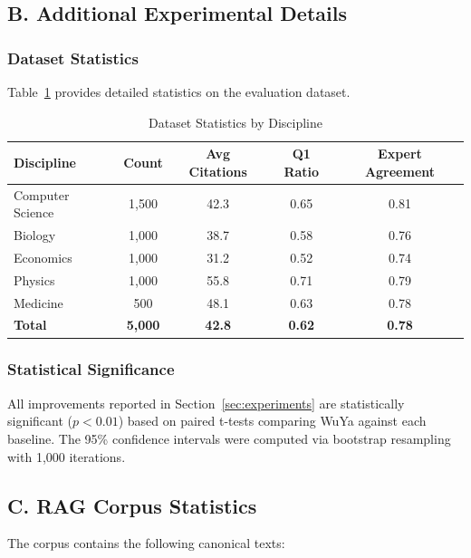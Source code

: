 \subsection{B. Additional Experimental Details}

\subsubsection{Dataset Statistics}

Table~\ref{tab:dataset-stats} provides detailed statistics on the evaluation dataset.

\begin{table}[h]
\centering
\caption{Dataset Statistics by Discipline}
\label{tab:dataset-stats}
\begin{tabular}{@{}lcccc@{}}
\toprule
\textbf{Discipline} & \textbf{Count} & \textbf{Avg Citations} & \textbf{Q1 Ratio} & \textbf{Expert Agreement} \\
\midrule
Computer Science & 1,500 & 42.3 & 0.65 & 0.81 \\
Biology & 1,000 & 38.7 & 0.58 & 0.76 \\
Economics & 1,000 & 31.2 & 0.52 & 0.74 \\
Physics & 1,000 & 55.8 & 0.71 & 0.79 \\
Medicine & 500 & 48.1 & 0.63 & 0.78 \\
\midrule
\textbf{Total} & \textbf{5,000} & \textbf{42.8} & \textbf{0.62} & \textbf{0.78} \\
\bottomrule
\end{tabular}
\end{table}

\subsubsection{Statistical Significance}

All improvements reported in Section~\ref{sec:experiments} are statistically significant ($p < 0.01$) based on paired t-tests comparing WuYa against each baseline. The 95\% confidence intervals were computed via bootstrap resampling with 1,000 iterations.

\subsection{C. RAG Corpus Statistics}

The \rag{} corpus contains the following canonical texts:

